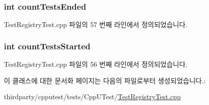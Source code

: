 \subsubsection[{\texorpdfstring{count\+Tests\+Ended}{countTestsEnded}}]{\setlength{\rightskip}{0pt plus 5cm}int count\+Tests\+Ended}\hypertarget{class_mock_test_result_ae36e823016b474b806feeca37b6fa116}{}\label{class_mock_test_result_ae36e823016b474b806feeca37b6fa116}


Test\+Registry\+Test.\+cpp 파일의 57 번째 라인에서 정의되었습니다.

\subsubsection[{\texorpdfstring{count\+Tests\+Started}{countTestsStarted}}]{\setlength{\rightskip}{0pt plus 5cm}int count\+Tests\+Started}\hypertarget{class_mock_test_result_ad3b398c9c6074906f6614232853b0dab}{}\label{class_mock_test_result_ad3b398c9c6074906f6614232853b0dab}


Test\+Registry\+Test.\+cpp 파일의 56 번째 라인에서 정의되었습니다.



이 클래스에 대한 문서화 페이지는 다음의 파일로부터 생성되었습니다.\+:\begin{DoxyCompactItemize}
\item 
thirdparty/cpputest/tests/\+Cpp\+U\+Test/\hyperlink{_test_registry_test_8cpp}{Test\+Registry\+Test.\+cpp}\end{DoxyCompactItemize}
